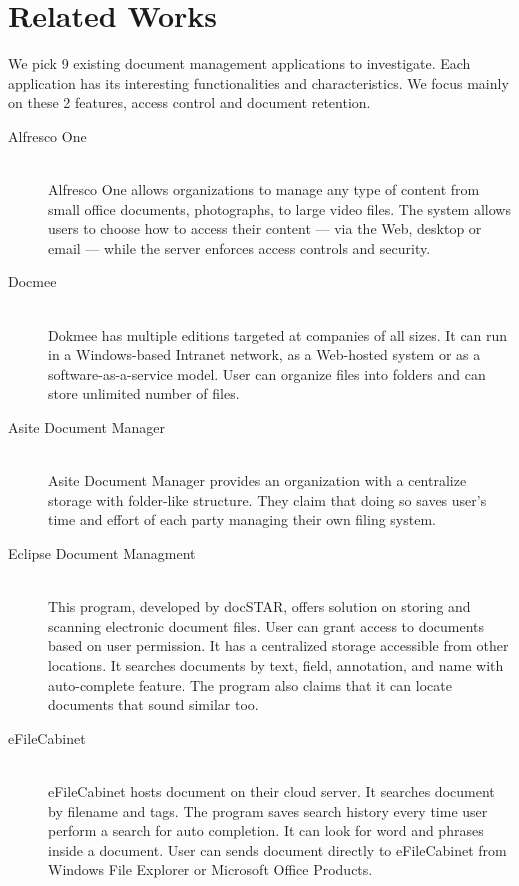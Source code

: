 \section{Related Works} \label{relate-works}
We pick 9 existing document management applications to investigate.
Each application has its interesting functionalities and characteristics.
We focus mainly on these 2 features, access control and document retention.
\begin{description}
\item[Alfresco One] \hfill \\
Alfresco One allows organizations to manage any type of content from small office documents, photographs, to large video files.
The system allows users to choose how to access their content --- via the Web, desktop or email --- while the server enforces access controls and security.

\item[Docmee] \hfill \\
Dokmee has multiple editions targeted at companies of all sizes.
It can run in a Windows-based Intranet network, as a Web-hosted system or as a software-as-a-service model.
User can organize files into folders and can store unlimited number of files.

\item[Asite Document Manager] \hfill \\
Asite Document Manager provides an organization with a centralize storage with folder-like structure.
They claim that doing so saves user's time and effort of each party managing their own filing system.

\item[Eclipse Document Managment] \hfill \\
This program, developed by docSTAR, offers solution on storing and scanning electronic document files.
User can grant access to documents based on user permission.
It has a centralized storage accessible from other locations.
It searches documents by text, field, annotation, and name with auto-complete feature.
The program also claims that it can locate documents that sound similar too.

\item[eFileCabinet] \hfill \\
eFileCabinet hosts document on their cloud server.
It searches document by filename and tags.
The program saves search history every time user perform a search for auto completion.
It can look for word and phrases inside a document.
User can sends document directly to eFileCabinet from Windows File Explorer or Microsoft Office Products.


\end{description}
